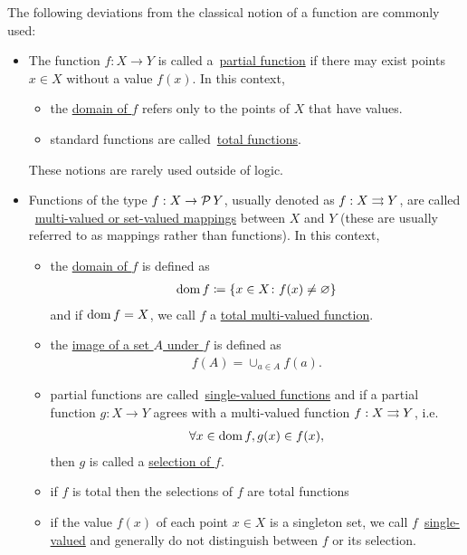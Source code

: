 \begin{definition}
  The following deviations from the classical notion of a function are commonly used:
  \begin{itemize}
    \item The function $f: X \to Y$ is called a~\uline{partial function} if there may exist points $x \in X$ without a value $f(x)$. In this context,
    \begin{itemize}
      \item the \uline{domain of $f$} refers only to the points of $X$ that have values.
      \item standard functions are called~\uline{total functions}.
    \end{itemize}

    These notions are rarely used outside of logic.

    \item Functions of the type $f: X \to \operatorname{\mathcal P} Y$, usually denoted as $f: X \rightrightarrows Y$, are called ~\uline{multi-valued or set-valued mappings} between $X$ and $Y$ (these are usually referred to as mappings rather than functions). In this context,
    \begin{itemize}
      \item the \uline{domain of $f$} is defined as
      \begin{align*}
        \operatorname{dom} f \coloneqq \{ x \in X \colon f(x) \neq \varnothing \}
      \end{align*}
      and if $\operatorname{dom} f = X$, we call $f$ a \uline{total multi-valued function}.

      \item the \uline{image of a set $A$ under $f$} is defined as
      \begin{align*}
        f(A) = \cup_{a \in A} f(a).
      \end{align*}

      \item partial functions are called~\uline{single-valued functions} and if a partial function $g: X \to Y$ agrees with a multi-valued function $f: X \rightrightarrows Y$, i.e.
      \begin{align*}
        \forall x \in \operatorname{dom} f, g(x) \in f(x),
      \end{align*}
      then $g$ is called a \uline{selection of $f$}.

      \item if $f$ is total then the selections of $f$ are total functions

      \item if the value $f(x)$ of each point $x \in X$ is a singleton set, we call $f$~\uline{single-valued} and generally do not distinguish between $f$ or its selection.
    \end{itemize}
  \end{itemize}
\end{definition}

